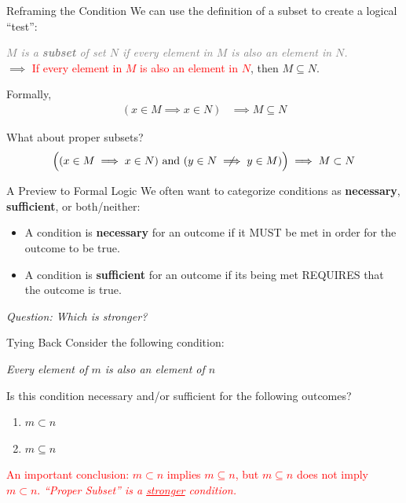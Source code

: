 \documentclass[10pt]{beamer}
\begin{document}
\begin{frame}{Reframing the Condition}
    We can use the definition of a subset to create a logical ``test'': 

    \textcolor{gray}{\textit{$M$ is a \textbf{subset} of set $N$ if every element in $M$ is also an element in $N$.}} \\
    $\implies$ \textcolor{red}{If every element in $M$ is also an element in $N$}, then $M \subseteq N$.

    Formally, 
    \begin{align*}
        (x \in M \implies x \in N) & \implies M \subseteq N
    \end{align*}
    \pause

    What about proper subsets?
    \begin{align*}
        \Big((x \in M \implies x \in N) \text{ and } (y \in N \centernot\implies y \in M)\Big) \implies M \subset N
    \end{align*}
\end{frame}

\begin{frame}{A Preview to Formal Logic}
    We often want to categorize conditions as \textbf{necessary}, \textbf{sufficient}, or both/neither:
\begin{itemize}
    \item A condition is \textbf{necessary} for an outcome if it MUST be met in order for the outcome to be true.
    \item A condition is \textbf{sufficient} for an outcome if its being met REQUIRES that the outcome is true.
\end{itemize}

\textit{Question: Which is stronger?}
\end{frame}

\begin{frame}{Tying Back}
    Consider the following condition:

    \textit{Every element of $m$ is also an element of $n$}


    Is this condition necessary and/or sufficient for the following outcomes?
\begin{enumerate}
    \item $m \subset n$
    \item $m \subseteq n$
\end{enumerate}
\vspace{.7cm}
\pause
\textcolor{red}{An important conclusion: $m \subset n$ implies $m \subseteq n$, but $m \subseteq n$ does not imply $m \subset n$. \emph{``Proper Subset'' is a \underline{stronger} condition.}}
\end{frame}
\end{document}
